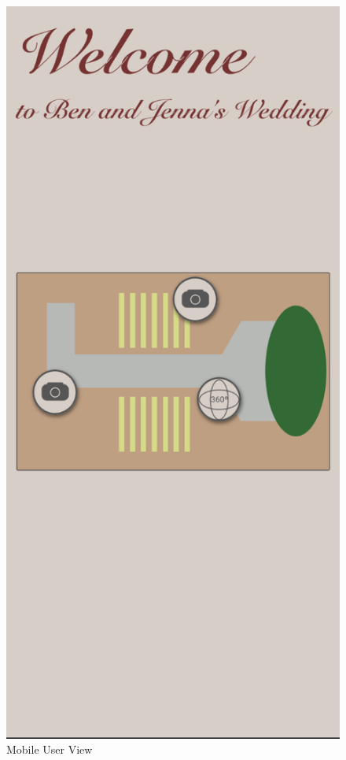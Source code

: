\documentclass[onecolumn, draftclsnofoot,10pt, compsoc]{IEEEtran}
\begin{document}
\begin{figure}[H]
            \label{fig:MLogin}
        \endminipage\hfill
            \includegraphics[scale=0.4]{Images/mobile-main.png}
            \centering\caption{Mobile User View}
            \label{fig:MUser}
        \endminipage\hfill

        \end{figure}
\end{document}
